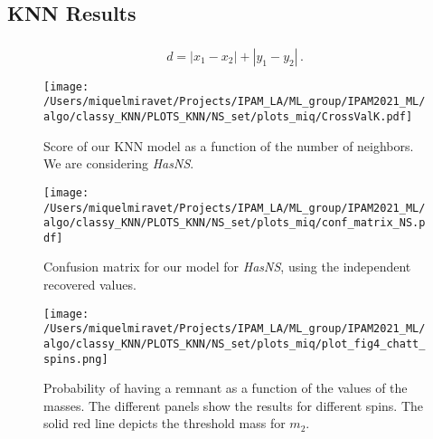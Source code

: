 \subsection{KNN Results}


\subsubsection{}
\begin{equation}
	d = |x_1-x_2|+|y_1-y_2|\,.
\end{equation}


\begin{figure}
    \texttt{[image: /Users/miquelmiravet/Projects/IPAM\_LA/ML\_group/IPAM2021\_ML/algo/classy\_KNN/PLOTS\_KNN/NS\_set/plots\_miq/CrossValK.pdf]}
    \caption{Score of our KNN model as a function of the number of neighbors. We are considering \textit{HasNS}.}
    \label{fig:crossvalK}
\end{figure}
    
\begin{figure}
    \texttt{[image: /Users/miquelmiravet/Projects/IPAM\_LA/ML\_group/IPAM2021\_ML/algo/classy\_KNN/PLOTS\_KNN/NS\_set/plots\_miq/conf\_matrix\_NS.pdf]}
    \caption{Confusion matrix for our model for \textit{HasNS}, using the independent recovered values. }
    \label{fig:confmat}
\end{figure}

\begin{figure}
    \texttt{[image: /Users/miquelmiravet/Projects/IPAM\_LA/ML\_group/IPAM2021\_ML/algo/classy\_KNN/PLOTS\_KNN/NS\_set/plots\_miq/plot\_fig4\_chatt\_spins.png]}
    \caption{Probability of having a remnant as a function of the values of the masses. The different panels show the results for different spins. The solid red line depicts the threshold mass for $m_2$.}
    \label{fig:m1m2}
\end{figure}

